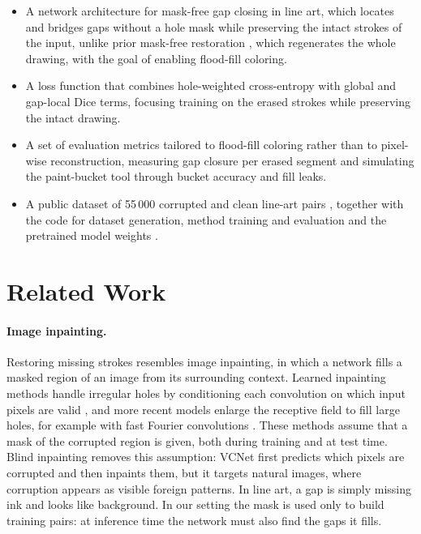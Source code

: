 \documentclass[11pt]{article}
\begin{document}
\begin{itemize}
\item A network architecture for mask-free gap closing in line art, which
  locates and bridges gaps without a hole mask while preserving the intact strokes
  of the input, unlike prior mask-free restoration \citep{sasaki2017joint}, which
  regenerates the whole drawing, with the goal of enabling flood-fill coloring.
\item A loss function that combines hole-weighted cross-entropy with global and
  gap-local Dice terms, focusing training on the erased strokes while preserving
  the intact drawing.
\item A set of evaluation metrics tailored to flood-fill coloring rather than to
  pixel-wise reconstruction, measuring gap closure per erased segment and
  simulating the paint-bucket tool through bucket accuracy and fill leaks.
\item A public dataset of 55\,000 corrupted and clean line-art pairs
  \citep{datasetInkCloser}, together with the code for dataset generation, method
  training and evaluation and the pretrained model weights \citep{codeInkCloser}.
\end{itemize}

\section{Related Work}
\label{sec:related}

\paragraph{Image inpainting.}
Restoring missing strokes resembles image inpainting, in which a network fills a
masked region of an image from its surrounding context. Learned inpainting methods
handle irregular holes by conditioning each convolution on which input pixels are
valid \citep{liu2018partialconv,yu2019gatedconv}, and more recent models enlarge
the receptive field to fill large holes, for example with fast Fourier convolutions
\citep{suvorov2022lama}. These methods assume that a mask of the corrupted region
is given, both during training and at test time. Blind inpainting removes this
assumption: VCNet \citep{wang2020vcnet} first predicts which pixels are corrupted
and then inpaints them, but it targets natural images, where corruption appears as
visible foreign patterns. In line art, a gap is simply missing ink and looks like
background. In our setting the mask is used only to build training pairs: at
inference time the network must also find the gaps it fills.
\end{document}
